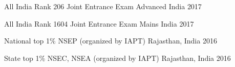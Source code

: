 \begin{cvhonors}

  \cvhonor
  {All India Rank 206}
  {Joint Entrance Exam Advanced}
  {India}
  {2017}

  \cvhonor
  {All India Rank 1604}
  {Joint Entrance Exam Mains}
  {India}
  {2017}


  \cvhonor
  {National top 1\%}
  {NSEP (organized by IAPT)}
  {Rajasthan, India}
  {2016}
  
  \cvhonor
  {State top 1\%}
  {NSEC, NSEA (organized by IAPT)}
  {Rajasthan, India}
  {2016}


\end{cvhonors}

